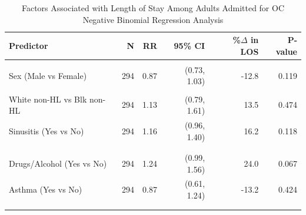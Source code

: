 \documentclass[
]{article}
\begin{document}
\begin{table}[t]
\caption*{
{\fontsize{20}{25}\selectfont  Factors Associated with Length of Stay Among Adults Admitted for OC\small } \\ 
{\fontsize{14}{17}\selectfont  Negative Binomial Regression Analysis\small }
} 
\begin{tabular*}{0.85\linewidth}{@{\extracolsep{\fill}}lrrrrr}
\toprule
Predictor & N & RR & 95\% CI & \%\ensuremath{\Delta} in LOS & P-value \\ 
\midrule\addlinespace[2.5pt]
{\cellcolor[HTML]{FFF3CD}{Age (per 1yr)}} & {\cellcolor[HTML]{FFF3CD}{294}} & {\cellcolor[HTML]{FFF3CD}{1.01}} & {\cellcolor[HTML]{FFF3CD}{(1.00, 1.01)}} & {\cellcolor[HTML]{FFF3CD}{0.5}} & {\cellcolor[HTML]{FFF3CD}{0.035}} \\ 
Sex (Male vs Female) & 294 & 0.87 & (0.73, 1.03) & -12.8 & 0.119 \\ 
{\cellcolor[HTML]{FFF3CD}{HL vs Blk non-HL}} & {\cellcolor[HTML]{FFF3CD}{294}} & {\cellcolor[HTML]{FFF3CD}{1.58}} & {\cellcolor[HTML]{FFF3CD}{(1.07, 2.34)}} & {\cellcolor[HTML]{FFF3CD}{58.2}} & {\cellcolor[HTML]{FFF3CD}{0.019}} \\ 
White non-HL vs Blk non-HL & 294 & 1.13 & (0.79, 1.61) & 13.5 & 0.474 \\ 
Sinusitis (Yes vs No) & 294 & 1.16 & (0.96, 1.40) & 16.2 & 0.118 \\ 
{\cellcolor[HTML]{FFF3CD}{Diabetes (Yes vs No)}} & {\cellcolor[HTML]{FFF3CD}{294}} & {\cellcolor[HTML]{FFF3CD}{1.45}} & {\cellcolor[HTML]{FFF3CD}{(1.16, 1.81)}} & {\cellcolor[HTML]{FFF3CD}{44.9}} & {\cellcolor[HTML]{FFF3CD}{0.001}} \\ 
{\cellcolor[HTML]{FFF3CD}{Immuno (Yes vs No)}} & {\cellcolor[HTML]{FFF3CD}{294}} & {\cellcolor[HTML]{FFF3CD}{1.80}} & {\cellcolor[HTML]{FFF3CD}{(1.46, 2.23)}} & {\cellcolor[HTML]{FFF3CD}{80.0}} & {\cellcolor[HTML]{FFF3CD}{<0.001}} \\ 
Drugs/Alcohol (Yes vs No) & 294 & 1.24 & (0.99, 1.56) & 24.0 & 0.067 \\ 
Asthma (Yes vs No) & 294 & 0.87 & (0.61, 1.24) & -13.2 & 0.424 \\ 
{\cellcolor[HTML]{FFF3CD}{Trauma (Yes vs No)}} & {\cellcolor[HTML]{FFF3CD}{294}} & {\cellcolor[HTML]{FFF3CD}{1.29}} & {\cellcolor[HTML]{FFF3CD}{(1.01, 1.66)}} & {\cellcolor[HTML]{FFF3CD}{29.5}} & {\cellcolor[HTML]{FFF3CD}{0.040}} \\ 
{\cellcolor[HTML]{FFF3CD}{Prior Surgery (Yes vs No)}} & {\cellcolor[HTML]{FFF3CD}{294}} & {\cellcolor[HTML]{FFF3CD}{0.73}} & {\cellcolor[HTML]{FFF3CD}{(0.54, 0.98)}} & {\cellcolor[HTML]{FFF3CD}{-27.2}} & {\cellcolor[HTML]{FFF3CD}{0.035}} \\ 

\end{tabular*}
\end{table}
\end{document}
